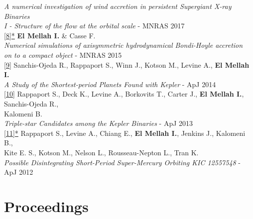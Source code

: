 \begin{flushleft}
\emph{A numerical investigation of wind accretion in persistent Supergiant X-ray Binaries}\\
\emph{I - Structure of the flow at the orbital scale} - MNRAS 2017\\
\vspace*{0.3cm}
\href{https://academic.oup.com/mnras/article-lookup/doi/10.1093/mnras/stv2184}{[8]*} \textbf{El Mellah I.} \& Casse F. \\ 
\emph{Numerical simulations of axisymmetric hydrodynamical Bondi-Hoyle accretion}\\
\emph{on to a compact object} - MNRAS 2015\\
\vspace*{0.3cm}
\href{http://iopscience.iop.org/article/10.1088/0004-637X/787/1/47/meta}{[9]} Sanchis-Ojeda R., Rappaport S., Winn J., Kotson M., Levine A., \textbf{El Mellah I.}\\
\emph{A Study of the Shortest-period Planets Found with Kepler} - ApJ 2014\\ 
\vspace*{0.3cm}
\href{http://iopscience.iop.org/article/10.1088/0004-637X/768/1/33/meta}{[10]} Rappaport S., Deck K., Levine A., Borkovits T., Carter J., \textbf{El Mellah I.}, Sanchis-Ojeda R., \\ Kalomeni B.\\ 
\emph{Triple-star Candidates among the Kepler Binaries} - ApJ 2013\\
\vspace*{0.3cm}
\href{http://iopscience.iop.org/article/10.1088/0004-637X/752/1/1}{[11]*} Rappaport S., Levine A., Chiang E., \textbf{El Mellah I.}, Jenkins J., Kalomeni B.,\\
Kite E. S., Kotson M., Nelson L., Rousseau-Nepton L., Tran K. \\ 
\emph{Possible Disintegrating Short-Period Super-Mercury Orbiting KIC 12557548} - ApJ 2012\\

\end{flushleft}


\newpage

\section*{Proceedings}

